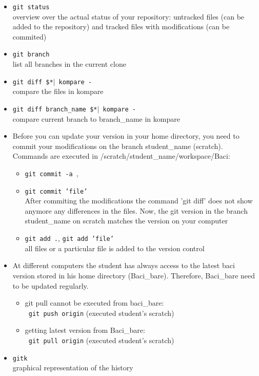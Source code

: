 \begin{itemize}
  \item \texttt{git status} \\
  overview over the actual status of your repository: untracked files (can be added to the repository) and tracked files with modifications (can be commited)
  \item \texttt{git branch} \\ 
  list all branches in the current clone
  \item  \texttt{git diff \$*$\mid$ kompare -} \\
  compare the files in kompare
  \item \texttt{git diff branch\_name \$*$\mid$ kompare -} \\
  compare current branch to branch\_name in kompare
  \item Before you can update your version in your home directory, you need to commit your modifications on the branch student\_name (scratch). Commands are executed in /scratch/student\_name/workspace/Baci:
  \begin{itemize}
    \item \texttt{git commit -a }, 
    \item \texttt{git commit 'file'}\\
    After commiting the modifications the command 'git diff' does not show anymore any differences in the files. Now, the git version in the branch student\_name on scratch matches the version on your computer 
    \item \texttt{git add .}, \texttt{git add 'file' }\\
    all files or a particular file is added to the version control
  \end{itemize}
  \item At different computers the student has always access to the latest baci version stored in his home directory (Baci\_bare). Therefore, Baci\_bare need to be updated regularly.
  \begin{itemize}
    \item git pull cannot be executed from baci\_bare: \\
  \texttt{ git push origin} (executed student's scratch)
    \item getting latest version from Baci\_bare: \\
   \texttt{ git pull origin} (executed student's scratch) 
  \end{itemize}
  
  \item \texttt{gitk} \\
  graphical representation of the history
\end{itemize}



